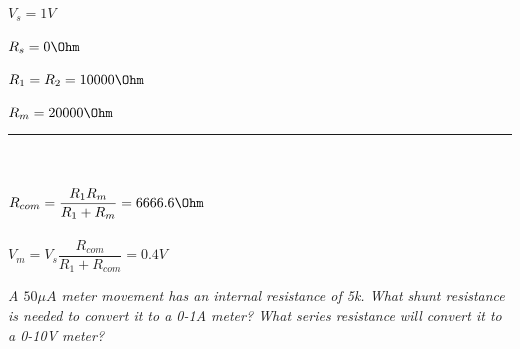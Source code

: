 \documentclass{article}
\begin{document}
\begin{enumerate}
        $V_{s} = 1V$ \\\\
        $R_{s} = 0 \Ohm$ \\\\
        $R_{1} = R_{2} = 10000 \Ohm$ \\\\
        $R_{m} = 20000 \Ohm$ \\
        \noindent\rule{4cm}{.1pt} \\\\
        $R_{com} = \dfrac{R_{1} R_{m}}{R_{1} + R_{m}} = 6666.6 \Ohm$ \\\\
        $V_{m} = V_{s} \dfrac{R_{com}}{R_{1} + R_{com}} = 0.4V$ \\

   \end{enumerate}

    \textit{A $50 \mu A$ meter movement has an internal resistance of 5k. What shunt resistance is needed to convert it to a 0-1A meter? What series resistance will convert it to a 0-10V meter?}
\end{document}
